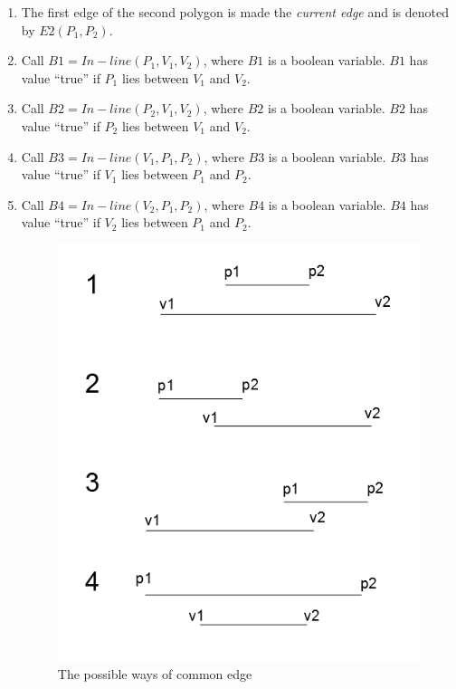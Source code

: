 	\begin{enumerate}
	\item
	\label{commthree}
	The first edge of the second polygon is made the {\em current edge} and
	is denoted by $E2 (P_{1},P_{2})$.
	\item
	Call $B1 = In-line(P_{1},V_{1},V_{2})$, where $B1$ is a boolean variable.
	$B1$ has value ``true'' if $P_{1}$ lies between $V_{1}$ and $V_{2}$.
	\item
	Call $B2 = In-line(P_{2},V_{1},V_{2})$, where $B2$ is a boolean variable.
	$B2$ has value ``true'' if $P_{2}$ lies between $V_{1}$ and $V_{2}$.
	\item
	Call $B3 = In-line(V_{1},P_{1},P_{2})$, where $B3$ is a boolean variable.
	$B3$ has value ``true'' if $V_{1}$ lies between $P_{1}$ and $P_{2}$.
	\item
	Call $B4 = In-line(V_{2},P_{1},P_{2})$, where $B4$ is a boolean variable.
	$B4$ has value ``true'' if $V_{2}$ lies between $P_{1}$ and $P_{2}$.
        \begin{figure}[htbp]
	\hspace{2cm}
	\includegraphics[scale=0.8]{commedg.png}
            \caption{The possible ways of common edge}
            \label{commedg}
        \end{figure}


\end{enumerate}
